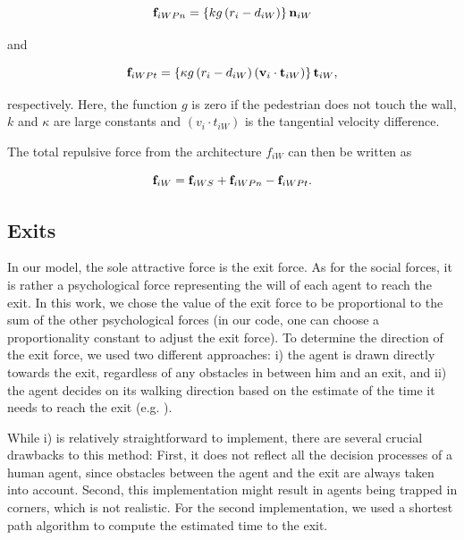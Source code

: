 \documentclass[11pt]{article}
\begin{document}
\begin{equation}
	{{\bf f}_{iWPn}} = \left\{ {kg\left( {{r_i} - {d_{iW}}} \right)} \right\}{{\bf n}_{iW}}
	\label{eq:fiWPn}
\end{equation}

and

\begin{equation}
	{{\bf f}_{iWPt}} = \left\{ {\kappa g\left( {{r_i} - {d_{iW}}} \right)\left( {{{\bf v}_i} \cdot {{\bf t}_{iW}}} \right)} \right\}{{\bf t}_{iW}} ,
	\label{eq:fiWPt}
\end{equation}

respectively. Here, the function $g$ is zero if the pedestrian does not touch the wall, $k$ and $\kappa$ are large constants and $(v_i \cdot t_{iW})$ is the tangential velocity difference.

The total repulsive force from the architecture $f_{iW}$ can then be written as

\begin{equation}
	{{\bf f}_{iW}} = {{\bf f}_{iWS}} + {{\bf f}_{iWPn}} - {{\bf f}_{iWPt}} .
	\label{eq:fiW}
\end{equation}



\subsection{Exits}
\label{sec:Exits1}

In our model, the sole attractive force is the exit force. As for the social forces, it is rather a psychological force representing the will of each agent to reach the exit. In this work, we chose the value of the exit force to be proportional to the sum of the other psychological forces (in our code, one can choose a proportionality constant to adjust the exit force). To determine the direction of the exit force, we used two different approaches: i) the agent is drawn directly towards the exit, regardless of any obstacles in between him and an exit, and ii) the agent decides on its walking direction based on the estimate of the time it needs to reach the exit (e.g. \citet{Graf,Kneidl}).

While i) is relatively straightforward to implement, there are several crucial drawbacks to this method: First, it does not reflect all the decision processes of a human agent, since obstacles between the agent and the exit are always taken into account. Second, this implementation might result in agents being trapped in corners, which is not realistic. For the second implementation, we used a shortest path algorithm to compute the estimated time to the exit.
\end{document}
